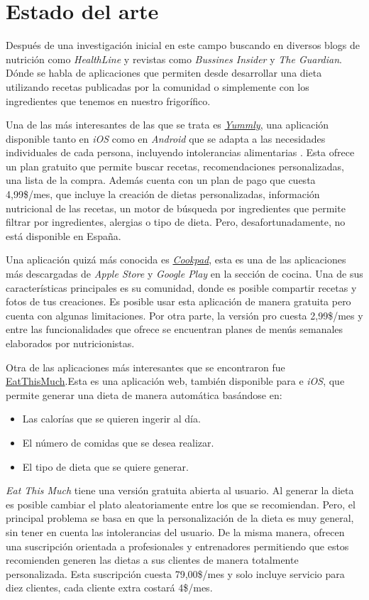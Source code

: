 \chapter{Estado del arte}
Después de una investigación inicial en este campo buscando en diversos blogs de nutrición como \emph{HealthLine}\cite{Healthline2022} y revistas como \emph{Bussines Insider}\cite{BusinessInsider2021} y \emph{The Guardian}. Dónde se habla de aplicaciones que permiten desde desarrollar una dieta utilizando recetas publicadas por la comunidad o simplemente con los ingredientes que tenemos en nuestro frigorífico. 

Una de las más interesantes de las que se trata es \href{https://www.yummly.com}{\emph{Yummly}}, una aplicación disponible tanto en \emph{iOS} como en \emph{Android} que se adapta a las necesidades individuales de cada persona, incluyendo intolerancias alimentarias \cite{TheGuardian2016}. Esta ofrece un plan gratuito que permite buscar recetas, recomendaciones personalizadas, una lista de la compra. Además cuenta con un plan de pago que cuesta 4,99\$/mes, que incluye la creación de dietas personalizadas, información nutricional de las recetas, un motor de búsqueda por ingredientes que permite filtrar por ingredientes, alergias o tipo de dieta. Pero, desafortunadamente, no está disponible en España. 

Una aplicación quizá más conocida es \href{https://cookpad.com/es/home}{\emph{Cookpad}}, esta es una de las aplicaciones más descargadas de \emph{Apple Store} y \emph{Google Play} en la sección de cocina. Una de sus características principales es su comunidad, donde es posible compartir recetas y fotos de tus creaciones. Es posible usar esta aplicación de manera gratuita pero cuenta con algunas limitaciones. Por otra parte, la versión pro cuesta 2,99\$/mes y entre las funcionalidades que ofrece se encuentran planes de menús semanales elaborados por nutricionistas.

Otra de las aplicaciones más interesantes que se encontraron fue \href{https://www.eatthismuch.com/}{EatThisMuch}.Esta es una aplicación web, también disponible para  e \emph{iOS}, que permite generar una dieta de manera automática basándose en:
\begin{itemize}
    \item Las calorías que se quieren ingerir al día.
    \item El número de comidas que se desea realizar.
    \item El tipo de dieta que se quiere generar.
\end{itemize}
\emph{Eat This Much} tiene una versión gratuita abierta al usuario. Al generar la dieta es posible cambiar el plato aleatoriamente entre los que se recomiendan. Pero, el principal problema se basa en que la personalización de la dieta es muy general, sin tener en cuenta las intolerancias del usuario. De la misma manera, ofrecen una suscripción orientada a profesionales y entrenadores permitiendo que estos recomienden generen las dietas a sus clientes de manera totalmente personalizada. Esta suscripción cuesta 79,00\$/mes y solo incluye servicio para diez clientes, cada cliente extra costará 4\$/mes. 


